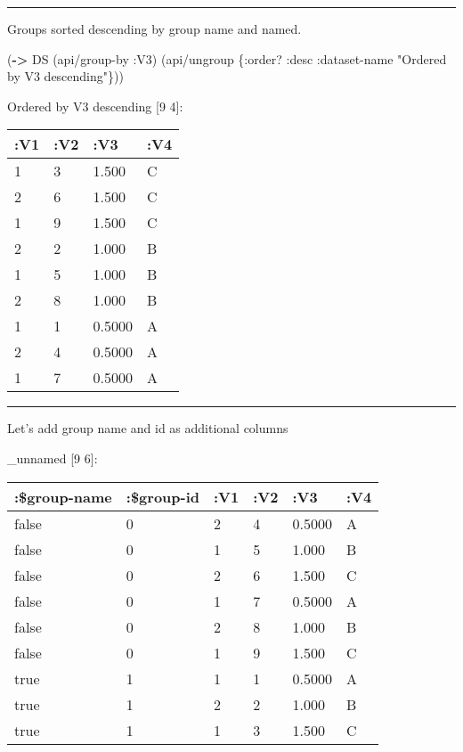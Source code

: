 \documentclass[]{article}
\newenvironment{Shaded}{\begin{snugshade}}{\end{snugshade}}
\newcommand{\KeywordTok}[1]{\textcolor[rgb]{0.13,0.29,0.53}{\textbf{#1}}}
\newcommand{\DecValTok}[1]{\textcolor[rgb]{0.00,0.00,0.81}{#1}}
\newcommand{\StringTok}[1]{\textcolor[rgb]{0.31,0.60,0.02}{#1}}
\newcommand{\VariableTok}[1]{\textcolor[rgb]{0.00,0.00,0.00}{#1}}
\newcommand{\AttributeTok}[1]{\textcolor[rgb]{0.77,0.63,0.00}{#1}}
\newcommand{\NormalTok}[1]{#1}
\begin{document}
\begin{center}\rule{0.5\linewidth}{0.5pt}\end{center}

Groups sorted descending by group name and named.

\begin{Shaded}
\begin{Highlighting}[]
\NormalTok{(}\KeywordTok{->}\NormalTok{ DS}
\NormalTok{    (api/group-by }\AttributeTok{:V3}\NormalTok{)}
\NormalTok{    (api/ungroup \{}\AttributeTok{:order}\NormalTok{? }\AttributeTok{:desc}
                  \AttributeTok{:dataset-name} \StringTok{"Ordered by V3 descending"}\NormalTok{\}))}
\end{Highlighting}
\end{Shaded}

Ordered by V3 descending {[}9 4{]}:

\begin{longtable}[]{@{}llll@{}}
\toprule
:V1 & :V2 & :V3 & :V4\tabularnewline
\midrule
\endhead
1 & 3 & 1.500 & C\tabularnewline
2 & 6 & 1.500 & C\tabularnewline
1 & 9 & 1.500 & C\tabularnewline
2 & 2 & 1.000 & B\tabularnewline
1 & 5 & 1.000 & B\tabularnewline
2 & 8 & 1.000 & B\tabularnewline
1 & 1 & 0.5000 & A\tabularnewline
2 & 4 & 0.5000 & A\tabularnewline
1 & 7 & 0.5000 & A\tabularnewline
\bottomrule
\end{longtable}

\begin{center}\rule{0.5\linewidth}{0.5pt}\end{center}

Let's add group name and id as additional columns

\begin{Shaded}
\end{Shaded}

\_unnamed {[}9 6{]}:

\begin{longtable}[]{@{}llllll@{}}
\toprule
:\$group-name & :\$group-id & :V1 & :V2 & :V3 & :V4\tabularnewline
\midrule
\endhead
false & 0 & 2 & 4 & 0.5000 & A\tabularnewline
false & 0 & 1 & 5 & 1.000 & B\tabularnewline
false & 0 & 2 & 6 & 1.500 & C\tabularnewline
false & 0 & 1 & 7 & 0.5000 & A\tabularnewline
false & 0 & 2 & 8 & 1.000 & B\tabularnewline
false & 0 & 1 & 9 & 1.500 & C\tabularnewline
true & 1 & 1 & 1 & 0.5000 & A\tabularnewline
true & 1 & 2 & 2 & 1.000 & B\tabularnewline
true & 1 & 1 & 3 & 1.500 & C\tabularnewline
\bottomrule
\end{longtable}
\end{document}
